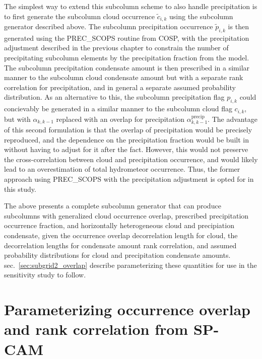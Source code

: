 The simplest way to extend this subcolumn scheme to also handle
precipitation is to first generate the subcolumn cloud occurrence
\(\tilde{c}_{i, k}\) using the subcolumn generator described above. The
subcolumn precipitation occurrence \(\tilde{p}_{i, k}\) is then
generated using the PREC\_SCOPS routine from COSP, with the
precipitation adjustment described in the previous chapter to constrain
the number of precipitating subcolumn elements by the precipitation
fraction from the model. The subcolumn precipitation condensate amount
is then prescribed in a similar manner to the subcolumn cloud condensate
amount but with a separate rank correlation for precipitation, and in
general a separate assumed probability distribution. As an alternative
to this, the subcolumn precipitation flag \(p_{i, k}\) could concievably
be generated in a similar manner to the subcolumn cloud flag
\(c_{i, k}\), but with \(\alpha_{k, k-1}\) replaced with an overlap for
precipitation \(\alpha^\textrm{precip}_{k, k-1}\). The advantage of this
second formulation is that the overlap of precipitation would be
precisely reproduced, and the dependence on the precipitation fraction
would be built in without having to adjust for it after the fact.
However, this would not preserve the cross-correlation between cloud and
precipitation occurrence, and would likely lead to an overestimation of
total hydrometeor occurrence. Thus, the former approach using
PREC\_SCOPS with the precipitation adjustment is opted for in this
study.

The above presents a complete subcolumn generator that can produce
subcolumns with generalized cloud occurrence overlap, prescribed
precipitation occurrence fraction, and horizontally heterogeneous cloud
and precipiation condensate, given the occurrence overlap decorrelation
length for cloud, the decorrelation lengths for condensate amount rank
correlation, and assumed probability distributions for cloud and
precipitation condensate amounts. sec.~\ref{sec:subgrid2_overlap}
describe parameterizing these quantities for use in the sensitivity
study to follow.

\section{Parameterizing occurrence overlap and rank correlation from
SP-CAM}\label{sec:subgrid2ux5foverlap}

